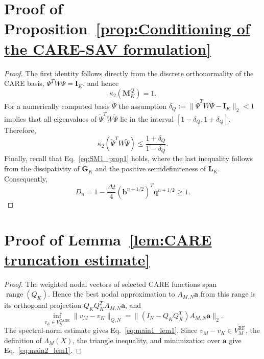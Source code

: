 \documentclass[10pt,reqno]{amsart}
\theoremstyle{remark}
\theoremstyle{definition}
\begin{document}
\section{Proof of Proposition~\ref{prop:Conditioning of the CARE-SAV formulation}}
\label{sec:pf:prop:conditioning}
\begin{proof}
  The first identity follows directly from the discrete orthonormality of the CARE basis, $\Psi^{T} W\Psi=\boldsymbol{I}_K$, and hence
  \begin{equation}
    \kappa_2(\boldsymbol{M}_K^Q)=1.
  \end{equation}
  For a numerically computed basis $\widetilde\Psi$ the assumption $\delta_Q:=\|\widetilde\Psi^{T} W\widetilde\Psi-\boldsymbol{I}_K\|_2<1$ implies that all eigenvalues of $\widetilde\Psi^{T} W\widetilde\Psi$ lie in the interval $[1-\delta_Q,1+\delta_Q]$. Therefore,
  \begin{equation}
    \kappa_2(\widetilde\Psi^{T} W\widetilde\Psi) \le \frac{1+\delta_Q}{1-\delta_Q}.
  \end{equation}
  Finally, recall that Eq.~\eqref{eq:SM1_prop1} holds, where the last inequality follows from the dissipativity of $\boldsymbol{G}_K$ and the positive semidefiniteness of $\boldsymbol{L}_K$. Consequently,
  \begin{equation}
    D_n = 1-\frac{\Delta t}{4} (\boldsymbol b^{n+1/2})^{T} \boldsymbol q^{n+1/2} \ge 1.
  \end{equation}
\end{proof}

\section{Proof of Lemma~\ref{lem:CARE truncation estimate}}
\label{sec:pf:lem:CARE truncation estimate}
\begin{proof}
  The weighted nodal vectors of selected CARE functions span $\operatorname{range}(Q_K)$. Hence the best nodal approximation to $A_{M,N}\boldsymbol a$ from this range is its orthogonal projection $Q_KQ_K^{T} A_{M,N}\boldsymbol a$, and
  $$
  \inf_{v_K\in V_K^{\mathrm{CARE}}}\|v_M-v_K\|_{Q,N}=\|(I_N-Q_KQ_K^{T})A_{M,N}\boldsymbol a\|_2.
  $$
  The spectral-norm estimate gives Eq.~\eqref{eq:main1_lem1}. Since $v_M-v_K\in V_M^{\mathrm{RF}}$, the definition of $\Lambda_M(X)$, the triangle inequality, and minimization over $\boldsymbol a$ give Eq.~\eqref{eq:main2_lem1}.
\end{proof}
\end{document}
